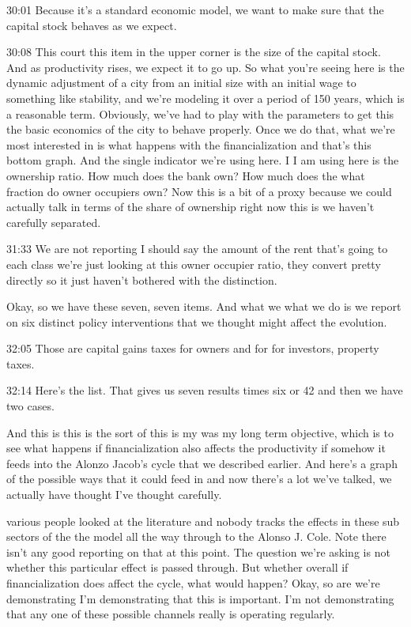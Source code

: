 \documentclass[]{article}
\begin{document}
30:01
Because it's a standard economic model, we want to make sure that the capital stock behaves as we expect.

30:08
This court this item in the upper corner is the size of the capital stock. And as productivity rises, we expect it to go up. So what you're seeing here is the dynamic adjustment of a city from an initial size with an initial wage to something like stability, and we're modeling it over a period of 150 years, which is a reasonable term. Obviously, we've had to play with the parameters to get this the basic economics of the city to behave properly. Once we do that, what we're most interested in is what happens with the financialization and that's this bottom graph. And the single indicator we're using here. I I am using here is the ownership ratio. How much does the bank own? How much does the what fraction do owner occupiers own? Now this is a bit of a proxy because we could actually talk in terms of the share of ownership right now this is we haven't carefully separated.

31:33
We are not reporting I should say the amount of the rent that's going to each class we're just looking at this owner occupier ratio, they convert pretty directly so it just haven't bothered with the distinction.

Okay, so we have these seven, seven items. And what we what we do is we report on six distinct policy interventions that we thought might affect the evolution.

32:05
Those are capital gains taxes for owners and for for investors, property taxes.

32:14
Here's the list.
That gives us seven results times six or 42 and then we have two cases. 

And this is this is the sort of this is my was my long term objective, which is to see what happens if financialization also affects the productivity if somehow it feeds into the Alonzo Jacob's cycle that we described earlier. And here's a graph of the possible ways that it could feed in and now there's a lot we've talked, we actually have thought I've thought carefully. 

various people looked at the literature and nobody tracks the effects in these sub sectors of the the model all the way through to the Alonso J. Cole. Note there isn't any good reporting on that at this point. The question we're asking is not whether this particular effect is passed through. But whether overall if financialization does affect the cycle, what would happen? Okay, so are we're demonstrating I'm demonstrating that this is important. I'm not demonstrating that any one of these possible channels really is operating regularly.
\end{document}
